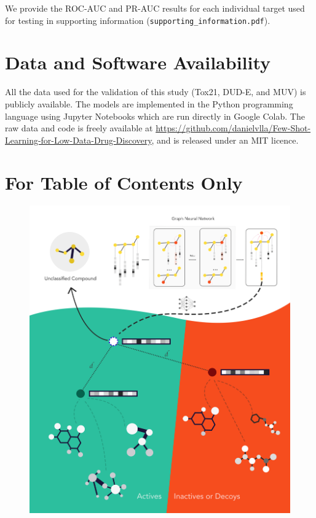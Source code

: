\documentclass[journal=jcisd8,manuscript=article]{achemso} %
\newenvironment{datasoftware}{%
\section*{Data and Software Availability}%
}{}
\begin{document}
\begin{suppinfo}
	
We provide the ROC-AUC and PR-AUC results for each individual target used for testing in supporting information (\texttt{supporting\_information.pdf}).

\end{suppinfo}


\begin{datasoftware}

All the data used for the validation of this study (Tox21, DUD-E, and MUV) is publicly available.  The models are implemented in the Python programming language using Jupyter Notebooks which are run directly in Google Colab.  The raw data and code is freely available at \url{https://github.com/danielvlla/Few-Shot-Learning-for-Low-Data-Drug-Discovery}, and is released under an MIT licence.
	
\end{datasoftware}



\pagebreak
\section{For Table of Contents Only}

\begin{figure}[!ht]
	\centering
	\includegraphics[width=0.95\linewidth]{img/For Table of Contents Only.png}
\end{figure}
\end{document}
